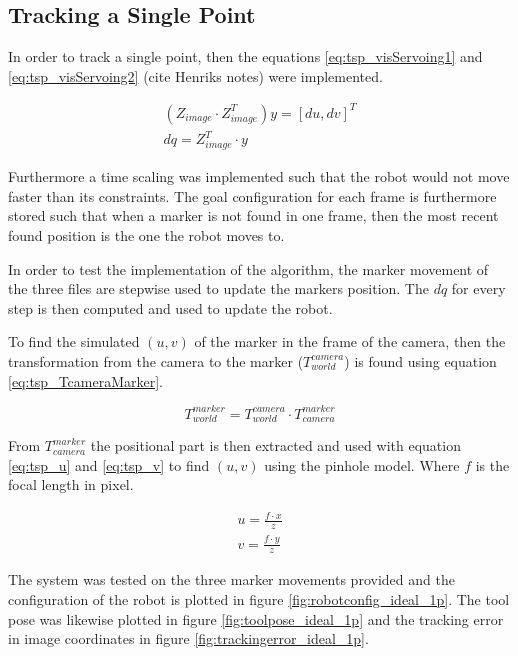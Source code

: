 \subsection{Tracking a Single Point}
In order to track a single point, then the equations \ref{eq:tsp_visServoing1} and \ref{eq:tsp_visServoing2} (cite Henriks notes) were implemented.

\begin{eqnarray}
(Z_{image} \cdot Z_{image}^T) y = [du, dv]^T \label{eq:tsp_visServoing1} \\
dq = Z_{image}^T \cdot y \label{eq:tsp_visServoing2}
\end{eqnarray}

Furthermore a time scaling was implemented such that the robot would not move faster than its constraints.
The goal configuration for each frame is furthermore stored such that when a marker is not found in one frame, then the most recent found position is the one the robot moves to.

In order to test the implementation of the algorithm, the marker movement of the three files are stepwise used to update the markers position.
The $dq$ for every step is then computed and used to update the robot.

To find the simulated $(u,v)$ of the marker in the frame of the camera, then the transformation from the camera to the marker ($T_{world}^{camera}$) is found using equation \ref{eq:tsp_TcameraMarker}.

\begin{equation}
T_{world}^{marker} = T_{world}^{camera} \cdot T_{camera}^{marker} \label{eq:tsp_TcameraMarker}
\end{equation}

From $T_{camera}^{marker}$ the positional part is then extracted and used with equation \ref{eq:tsp_u} and \ref{eq:tsp_v} to find $(u,v)$ using the pinhole model.
Where $f$ is the focal length in pixel.

\begin{eqnarray}
u = \frac{f \cdot x}{z} \label{eq:tsp_u} \\
v = \frac{f \cdot y}{z} \label{eq:tsp_v}
\end{eqnarray}


The system was tested on the three marker movements provided and the configuration of the robot is plotted in figure \ref{fig:robotconfig_ideal_1p}.
The tool pose was likewise plotted in figure \ref{fig:toolpose_ideal_1p} and the tracking error in image coordinates in figure \ref{fig:trackingerror_ideal_1p}.

